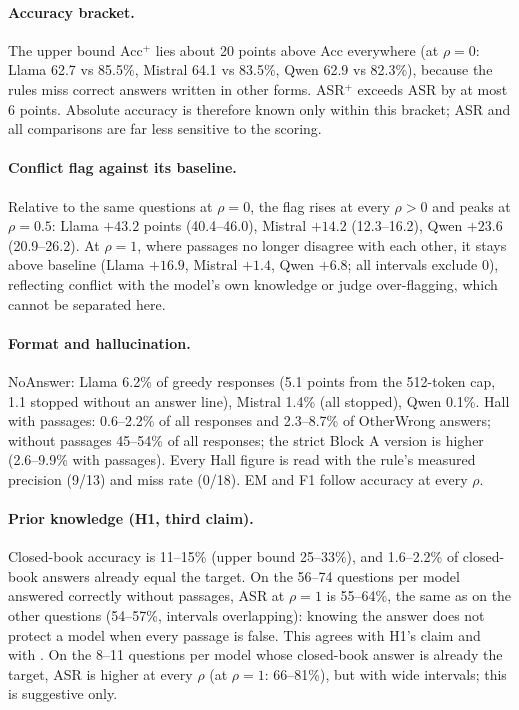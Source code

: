 \documentclass[11pt,a4paper]{report}
\begin{document}
\paragraph{Accuracy bracket.} The upper bound Acc$^{+}$ lies about 20 points above Acc everywhere (at
$\rho=0$: Llama 62.7 vs 85.5\%, Mistral 64.1 vs 83.5\%, Qwen 62.9 vs 82.3\%), because the rules miss correct
answers written in other forms. ASR$^{+}$ exceeds ASR by at most 6 points. Absolute accuracy is therefore
known only within this bracket; ASR and all comparisons are far less sensitive to the scoring.

\paragraph{Conflict flag against its baseline.} Relative to the same questions at $\rho=0$, the flag rises at
every $\rho>0$ and peaks at $\rho=0.5$: Llama $+43.2$ points (40.4--46.0), Mistral $+14.2$ (12.3--16.2), Qwen
$+23.6$ (20.9--26.2). At $\rho=1$, where passages no longer disagree with each other, it stays above baseline
(Llama $+16.9$, Mistral $+1.4$, Qwen $+6.8$; all intervals exclude 0), reflecting conflict with the model's own
knowledge or judge over-flagging, which cannot be separated here.

\paragraph{Format and hallucination.} NoAnswer: Llama 6.2\% of greedy responses (5.1 points from the
512-token cap, 1.1 stopped without an answer line), Mistral 1.4\% (all stopped), Qwen 0.1\%. Hall with
passages: 0.6--2.2\% of all responses and 2.3--8.7\% of OtherWrong answers; without passages 45--54\% of all
responses; the strict Block A version is higher (2.6--9.9\% with passages). Every Hall figure is read with the
rule's measured precision (9/13) and miss rate (0/18). EM and F1 follow accuracy at every $\rho$.

\paragraph{Prior knowledge (H1, third claim).} Closed-book accuracy is 11--15\% (upper bound 25--33\%), and
1.6--2.2\% of closed-book answers already equal the target. On the 56--74 questions per model answered
correctly without passages, ASR at $\rho=1$ is 55--64\%, the same as on the other questions (54--57\%, intervals
overlapping): knowing the answer does not protect a model when every passage is false. This agrees with
H1's claim and with \citet{wu2024clasheval}. On the 8--11 questions per model whose closed-book answer is
already the target, ASR is higher at every $\rho$ (at $\rho=1$: 66--81\%), but with wide intervals; this is
suggestive only.
\end{document}
